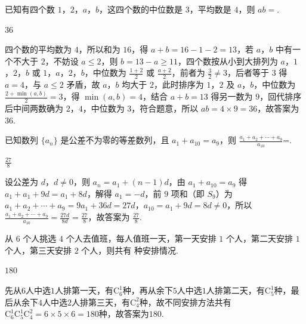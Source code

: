 \begin{problem}
已知有四个数 \(1\)，\(2\)，\(a\)，\(b\)，这四个数的中位数是 \(3\)，平均数是 \(4\)，则 \(ab=\)\fillinblank{}.
\end{problem}

\begin{answer}
\(36\)
\end{answer}

\begin{solution}
四个数的平均数为 \(4\)，所以和为 \(16\)，得 \(a+b=16-1-2=13\)，若 \(a\)，\(b\) 中有一个不大于 \(2\)，不妨设 \(a\le 2\)，则 \(b=13-a\ge 11\)，四个数按从小到大排列为 \(a\)，\(1\)，\(2\)，\(b\) 或 \(1\)，\(a\)，\(2\)，\(b\)，中位数为 \(\frac{1+2}{2}\) 或 \(\frac{a+2}{2}\)，前者为 \(\frac32\ne 3\)，后者等于 \(3\) 得 \(a=4\)，与 \(a\le 2\) 矛盾，故 \(a\)，\(b\) 均大于 \(2\)，此时排序为 \(1\)，\(2\) 及 \(a\)，\(b\)，中位数为 \(\frac{2+\min\left(a,b\right)}{2}=3\)，得 \(\min\left(a,b\right)=4\)，结合 \(a+b=13\) 得另一数为 \(9\)，回代排序后中间两数确为 \(2\)，\(4\)，中位数为 \(3\)，符合题意，所以 \(ab=4\times 9=36\)，故答案为 \(36\).
\end{solution}

\begin{problem}
已知数列 \(\{a_n\}\) 是公差不为零的等差数列，且 \(a_1+a_{10}=a_9\)，则
\(\frac{a_1+a_2+\cdots+a_9}{a_{10}}\)=\fillinblank{}.
\end{problem}

\begin{answer}
\(\frac{27}{8}\)
\end{answer}

\begin{solution}
设公差为 \(d\)，\(d\ne 0\)，则 \(a_n=a_1+\left(n-1\right)d\)，由 \(a_1+a_{10}=a_9\) 得 \(a_1+a_1+9d=a_1+8d\)，解得 \(a_1=-d\)，前 \(9\) 项和（即 \(S_9\)）为 \(a_1+a_2+\cdots+a_9=9a_1+36d=27d\)，\(a_{10}=a_1+9d=8d\ne 0\)，所以 \(\frac{a_1+a_2+\cdots+a_9}{a_{10}}=\frac{27d}{8d}=\frac{27}{8}\)，故答案为 \(\frac{27}{8}\).
\end{solution}

\begin{problem}
从 \(6\) 个人挑选 \(4\) 个人去值班，每人值班一天，第一天安排 \(1\) 个人，第二天安排 \(1\) 个人，第三天安排 \(2\) 个人，则共有\fillinblank{} 种安排情况.
\end{problem}

\begin{answer}
\(180\)
\end{answer}

\begin{solution}
先从\(6\)人中选\(1\)人排第一天，有\(\mathrm C_6^1\)种，再从余下\(5\)人中选\(1\)人排第二天，有\(\mathrm C_5^1\)种，最后从余下\(4\)人中选\(2\)人排第三天，有\(\mathrm C_4^2\)种，故不同安排方法共有\(\mathrm C_6^1\mathrm C_5^1\mathrm C_4^2=6\times5\times6=180\)种，故答案为\(180\).
\end{solution}

